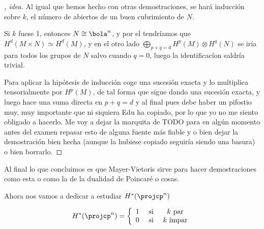 \documentclass[palatino, bibnumbers]{apuntes}
\begin{document}
\begin{proof}[, idea] Al igual que hemos hecho con otras demostraciones, se hará inducción sobre $k$, el número de abiertos de un buen cubrimiento de $N$.

Si $k$ fuese 1, entonces $N \cong \bola^n$, y por el  tendríamos que $H^d(M × N) \simeq H^d(M)$, y en el otro lado $\bigoplus_{p+ q = d} H^p(M) \otimes H^q(N)$ se iría para todos los grupos de $N$ salvo cuando $q = 0$, luego la identificacíon saldría trivial.

Para aplicar la hipótesis de inducción coge una sucesión exacta y lo multiplica tensorialmente por $H^p(M)$, de tal forma que sigue dando una sucesión exacta, y luego hace una suma directa en $p+q=d$ y al final pues debe haber un pifostio muy, muy importante que ni siquiera Edu ha copiado, por lo que yo no me siento obligado a hacerlo. Me voy a dejar la marquita de TODO para en algún momento antes del examen repasar esto de alguna fuente más fiable y o bien dejar la demostración bien hecha (aunque la hubiese copiado seguiría siendo una basura) o bien borrarlo.
\end{proof}

Al final lo que concluimos es que Mayer-Vietoris sirve para hacer demostraciones como esta o como la de la dualidad de Poincaré o cosas.


Ahora nos vamos a dedicar a estudiar $H^\ast(\projcp^n)$

\begin{theorem}
\[
	H^\ast(\projcp^n) = 
		\left\{ 
			\begin{array}{ccc} 	
				1 & \text{ si } & k \text{ par}\\ 
				0 & \text{ si } & k \text{ impar}\\ 
			\end{array}
		\right.
\]
\end{theorem}
\end{document}
